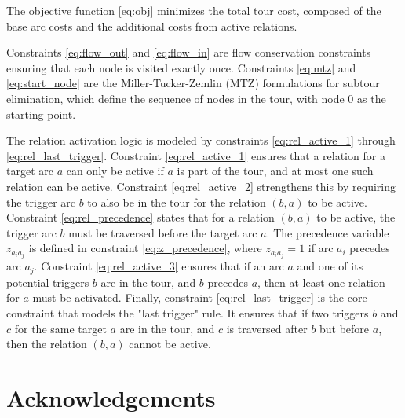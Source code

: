 \documentclass[twocolumn, switch]{article} %
\begin{document}
\normalsize

The objective function \eqref{eq:obj} minimizes the total tour cost, composed of the base arc costs and the additional costs from active relations.

Constraints \eqref{eq:flow_out} and \eqref{eq:flow_in} are flow conservation constraints ensuring that each node is visited exactly once.
Constraints \eqref{eq:mtz} and \eqref{eq:start_node} are the Miller-Tucker-Zemlin (MTZ) formulations for subtour elimination, which define the sequence of nodes in the tour, with node 0 as the starting point.

The relation activation logic is modeled by constraints \eqref{eq:rel_active_1} through \eqref{eq:rel_last_trigger}.
Constraint \eqref{eq:rel_active_1} ensures that a relation for a target arc $a$ can only be active if $a$ is part of the tour, and at most one such relation can be active.
Constraint \eqref{eq:rel_active_2} strengthens this by requiring the trigger arc $b$ to also be in the tour for the relation $(b,a)$ to be active.
Constraint \eqref{eq:rel_precedence} states that for a relation $(b,a)$ to be active, the trigger arc $b$ must be traversed before the target arc $a$.
The precedence variable $z_{a_ia_j}$ is defined in constraint \eqref{eq:z_precedence}, where $z_{a_ia_j}=1$ if arc $a_i$ precedes arc $a_j$.
Constraint \eqref{eq:rel_active_3} ensures that if an arc $a$ and one of its potential triggers $b$ are in the tour, and $b$ precedes $a$, then at least one relation for $a$ must be activated.
Finally, constraint \eqref{eq:rel_last_trigger} is the core constraint that models the "last trigger" rule. It ensures that if two triggers $b$ and $c$ for the same target $a$ are in the tour, and $c$ is traversed after $b$ but before $a$, then the relation $(b,a)$ cannot be active.


\footnotesize
\section*{Acknowledgements}

\normalsize



\end{document}
